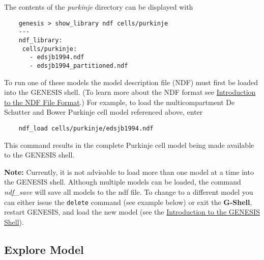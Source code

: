 \documentclass[12pt]{article}
\begin{document}
The contents of the {\it purkinje} directory can be displayed with
\begin{verbatim}
    genesis > show_library ndf cells/purkinje
    ---
    ndf_library:
     cells/purkinje:
       - edsjb1994.ndf
       - edsjb1994_partitioned.ndf
\end{verbatim}

To run one of these models the model description file (NDF) must first be loaded into the GENESIS shell.  (To learn more about the NDF format see  \href{../ndf-file-format/ndf-file-format.tex}{Introduction to the NDF File Format}.) For example, to load the multicompartment De Schutter and Bower Purkinje cell model referenced above, enter
\begin{verbatim}
    ndf_load cells/purkinje/edsjb1994.ndf
\end{verbatim}
This command results in the complete Purkinje cell model being made available to the GENESIS shell.

{\bf Note:} Currently, it is not advisable to load more than one model at a time into the GENESIS shell. Although multiple models can be loaded, the command {\it ndf\_save} will save all models to the ndf file. To change to a different model you can either issue the {\tt delete} command (see example below) or exit the {\bf G-Shell}, restart GENESIS, and load the new model (see the \href{../gshell/gshell.tex}{Introduction to the GENESIS Shell}).

\subsection*{Explore Model}
\end{document}
